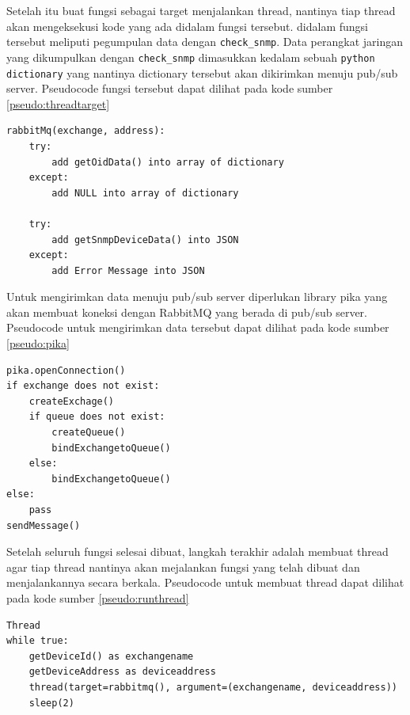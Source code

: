     			Setelah itu buat fungsi sebagai target menjalankan thread, nantinya tiap thread akan mengeksekusi kode yang ada didalam fungsi tersebut. didalam fungsi tersebut meliputi pegumpulan data dengan \texttt{check\_snmp}. Data perangkat jaringan yang dikumpulkan dengan \texttt{check\_snmp} dimasukkan kedalam sebuah \texttt{python dictionary} yang nantinya dictionary tersebut akan dikirimkan menuju pub/sub server. Pseudocode fungsi tersebut dapat dilihat pada kode sumber \ref{pseudo:threadtarget}
    			
\begin{lstlisting}[frame=single,breaklines,caption={Pseudocode Target \textit{Thread} Untuk Mengambil Data Perangkat},label=pseudo:threadtarget, captionpos=b]
rabbitMq(exchange, address):
	try:
		add getOidData() into array of dictionary
	except:
		add NULL into array of dictionary
	
	try:
		add getSnmpDeviceData() into JSON
	except:
		add Error Message into JSON		
\end{lstlisting}
    			
    			Untuk mengirimkan data menuju pub/sub server diperlukan library pika yang akan membuat koneksi dengan RabbitMQ yang berada di pub/sub server. Pseudocode untuk mengirimkan data tersebut dapat dilihat pada kode sumber \ref{pseudo:pika}
    			
\begin{lstlisting}[frame=single,breaklines,caption={Pseudocode Pengiriman Data Dengan Pika},label=pseudo:pika, captionpos=b]
pika.openConnection()
if exchange does not exist:
	createExchage()
	if queue does not exist:
		createQueue()
		bindExchangetoQueue()
	else:
		bindExchangetoQueue()
else:
	pass
sendMessage()
\end{lstlisting}
    			
				Setelah seluruh fungsi selesai dibuat, langkah terakhir adalah membuat thread agar tiap thread nantinya akan mejalankan fungsi yang telah dibuat dan menjalankannya secara berkala. Pseudocode untuk membuat thread dapat dilihat pada kode sumber \ref{pseudo:runthread}
				
\begin{lstlisting}[frame=single,breaklines,caption={Pseudocode Menjalankan Thread},label=pseudo:runthread, captionpos=b]
Thread
while true:
	getDeviceId() as exchangename
	getDeviceAddress as deviceaddress
	thread(target=rabbitmq(), argument=(exchangename, deviceaddress))
	sleep(2)

\end{lstlisting}

